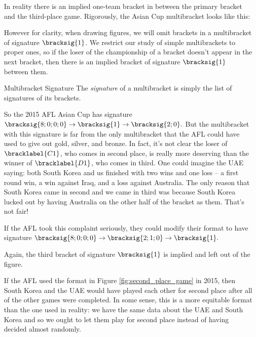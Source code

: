 {    In reality there is an implied one-team bracket in between the primary bracket and the third-place game. Rigorously, the Asian Cup multibracket looks like this:


    However for clarity, when drawing figures, we will omit brackets in a multibracket of signature $\bracksig{1}$. We restrict our study of simple multibrackets to proper ones, so if the loser of the championship of a bracket doesn't appear in the next bracket, then there is an implied bracket of signature $\bracksig{1}$ between them.

    \begin{definition}{Multibracket Signature}{}
        The \textit{signature} of a multibracket is simply the list of signatures of its brackets.
    \end{definition}

    So the 2015 AFL Asian Cup has signature $\bracksig{8;0;0;0} \to \bracksig{1} \to \bracksig{2;0}.$ But the multibracket with this signature is far from the only multibracket that the AFL could have used to give out gold, silver, and bronze. In fact, it's not clear the loser of $\bracklabel{C1}$, who comes in second place, is really more deserving than the winner of $\bracklabel{D1}$, who comes in third. One could imagine the UAE saying: both South Korea and us finished with two wins and one loss -- a first round win, a win against Iraq, and a loss against Australia. The only reason that South Korea came in second and we came in third was because South Korea lucked out by having Australia on the other half of the bracket as them. That's not fair!

    If the AFL took this complaint seriously, they could modify their format to have signature $\bracksig{8;0;0;0} \to \bracksig{2; 1; 0} \to \bracksig{1}.$
    

    Again, the third bracket of signature $\bracksig{1}$ is implied and left out of the figure.

    If the AFL used the format in Figure \ref{fig:second_place_game} in 2015, then South Korea and the UAE would have played each other for second place after all of the other games were completed. In some sense, this is a more equitable format than the one used in reality: we have the same data about the UAE and South Korea and so we ought to let them play for second place instead of having decided almost randomly.

}
